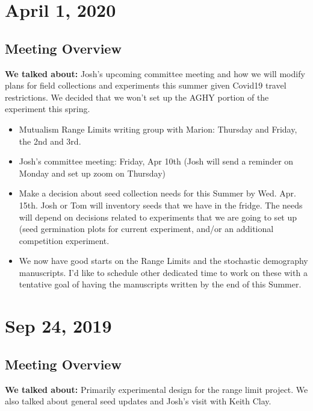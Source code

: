 \documentclass{article}
\begin{document}
  
\section*{April 1, 2020}
\subsection*{Meeting Overview}
\textbf{We talked about:}
Josh's upcoming committee meeting and how we will modify plans for field collections and experiments this summer given Covid19 travel restrictions. We decided that we won't set up the AGHY portion of the experiment this spring.
\begin{itemize}
\item{Mutualism Range Limits writing group with Marion: Thursday and Friday, the 2nd and 3rd.}
\item{Josh's committee meeting: Friday, Apr 10th (Josh will send a reminder on Monday and set up zoom on Thursday)}
\item{Make a decision about seed collection needs for this Summer by Wed. Apr. 15th. Josh or Tom will inventory seeds that we have in the fridge. The needs will depend on decisions related to experiments that we are going to set up (seed germination plots for current experiment, and/or an additional competition experiment.}
\item{We now have good starts on the Range Limits and the stochastic demography manuscripts. I'd like to schedule other dedicated time to work on these with a tentative goal of having the manuscripts written by the end of this Summer.}
\end{itemize}

  
\section*{Sep 24, 2019}
\subsection*{Meeting Overview}
\textbf{We talked about:}
 Primarily experimental design for the range limit project. We also talked about general seed updates and Josh's visit with Keith Clay.
 
\end{document}
